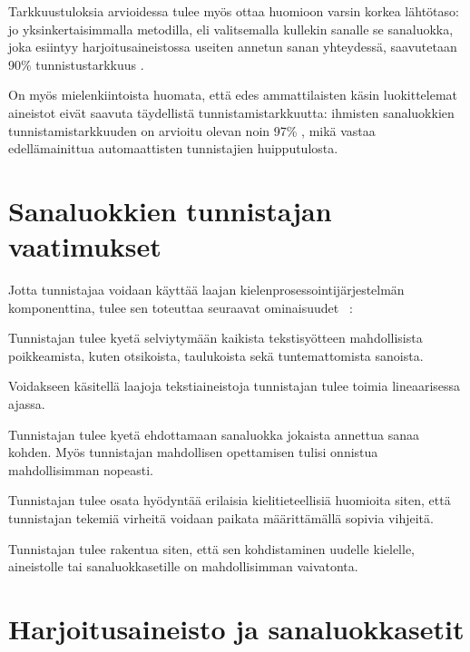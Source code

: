 \documentclass[utf8,bachelor,manualbib]{gradu3}
\begin{document}
Tarkkuustuloksia arvioidessa tulee myös ottaa huomioon varsin korkea lähtötaso: jo yksinkertaisimmalla metodilla, eli valitsemalla kullekin sanalle se sanaluokka, joka esiintyy harjoitusaineistossa useiten annetun sanan yhteydessä, saavutetaan 90\% tunnistustarkkuus \citep{charniak1993}.

 On myös mielenkiintoista huomata, että edes ammattilaisten käsin luokittelemat aineistot eivät saavuta täydellistä tunnistamistarkkuutta: ihmisten sanaluokkien tunnistamistarkkuuden on arvioitu olevan noin 97\% \citep{manning2011}, mikä vastaa edellämainittua automaattisten tunnistajien huipputulosta.


\section{Sanaluokkien tunnistajan vaatimukset}

Jotta tunnistajaa voidaan käyttää laajan kielenprosessointijärjestelmän komponenttina, tulee sen toteuttaa seuraavat ominaisuudet ~\citep{cutting1992}: 

\begin{description}[labelindent=1cm]
 \item[Kestävyys] Tunnistajan tulee kyetä selviytymään kaikista tekstisyötteen mahdollisista poikkeamista, kuten otsikoista, taulukoista sekä tuntemattomista sanoista.
 \item[Tehokkuus] Voidakseen käsitellä laajoja tekstiaineistoja tunnistajan tulee toimia lineaarisessa ajassa. 
 \item[Tarkkuus] Tunnistajan tulee kyetä ehdottamaan sanaluokka jokaista annettua sanaa kohden. Myös tunnistajan mahdollisen opettamisen tulisi onnistua mahdollisimman nopeasti.
 \item[Viritettävyys] Tunnistajan tulee osata hyödyntää erilaisia kielitieteellisiä huomioita siten, että tunnistajan tekemiä virheitä voidaan paikata määrittämällä sopivia vihjeitä.
 \item[Uudelleenkäytettävyys] Tunnistajan tulee rakentua siten, että sen kohdistaminen uudelle kielelle, aineistolle tai sanaluokkasetille on mahdollisimman vaivatonta.
\end{description}

\section{Harjoitusaineisto ja sanaluokkasetit}
\end{document}
